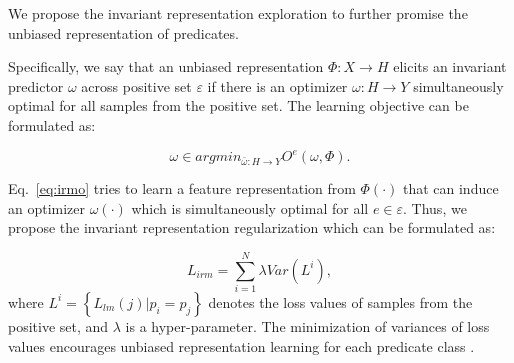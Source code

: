 \documentclass[letterpaper]{article} %
\begin{document}
 We propose the invariant representation exploration to further promise the unbiased representation of predicates.

Specifically, we say that an unbiased representation $ \Phi :X\to H $ elicits an invariant predictor $ \omega  $ across positive set $ \varepsilon  $ if there is an optimizer $ \omega :H\to Y $ simultaneously optimal for all samples from the positive set. The learning objective can be formulated as:

\begin{equation}
\label{eq:irmo}
    \omega \in argmin_{\bar{\omega}:H\to Y}O^{e}(\omega,\Phi).
\end{equation}

Eq.~\ref{eq:irmo} tries to learn a feature representation from $ \Phi (\cdot) $ that can induce an optimizer $ \omega(\cdot) $ which is simultaneously optimal for all $ e \in \varepsilon $.
Thus, we propose the invariant representation regularization which can be formulated as:

\begin{equation}
\label{eq:irm}
    L_{irm}=\sum_{i=1}^{N}\lambda Var(L^{i} ),
\end{equation}
where $ L^i=\left\{L_{lm}\left(j\right)|p_i=p_j\right\} $ denotes the loss values of samples from the positive set, and $ \lambda $ is a hyper-parameter. The minimization of variances of loss values encourages unbiased representation learning for each predicate class \cite{arjovsky2020invariant}.
\end{document}
